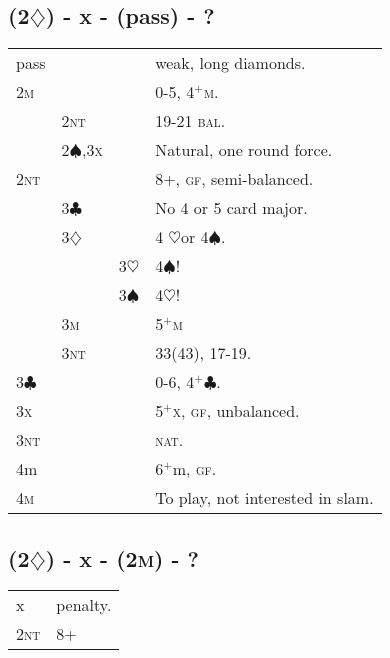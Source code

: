 \documentclass{article}
\newcommand{\bal}{\textsc{bal}}
\newcommand{\gf}{\textsc{gf}}
\renewcommand{\c}{\ensuremath{\clubsuit}}
\renewcommand{\d}{\ensuremath{\diamondsuit}}
\newcommand{\h}{\ensuremath{\heartsuit}}
\newcommand{\s}{\ensuremath{\spadesuit}}
\newcommand{\nt}{\textsc{nt}}
\newcommand{\x}{\textsc{x}}
\newcommand{\nat}{\textsc{nat}}
\newcommand{\+}{\ensuremath{^+}}
\newcommand{\M}{\textsc{m}}
\begin{document}
\subsection{(2\d) - x - (pass) - ?}
\begin{tabular}{llll}
pass &&& weak, long diamonds. \\
2\M &&& 0-5, 4\+\M. \\
& 2\nt && 19-21 \bal. \\
& 2\s,3\x && Natural, one round force.\\
2\nt &&& 8+, \gf, semi-balanced.\\
&3\c && No 4 or 5 card major.\\
&3\d && 4 \h or 4\s.\\
&&3\h & 4\s !\\
&&3\s & 4\h !\\
&3\M && 5\+\M \\
&3\nt && 33(43), 17-19.\\
3\c &&& 0-6, 4\+\c.\\
3\x &&& 5\+\x, \gf, unbalanced.\\
3\nt &&& \nat.\\
4m &&& 6\+m, \gf.\\
4\M&&& To play, not interested in slam.
\end{tabular}

\subsection{(2\d) - x - (2\M) - ?}
\begin{tabular}{ll}
x & penalty. \\
2\nt & 8+
\end{tabular}
\end{document}
